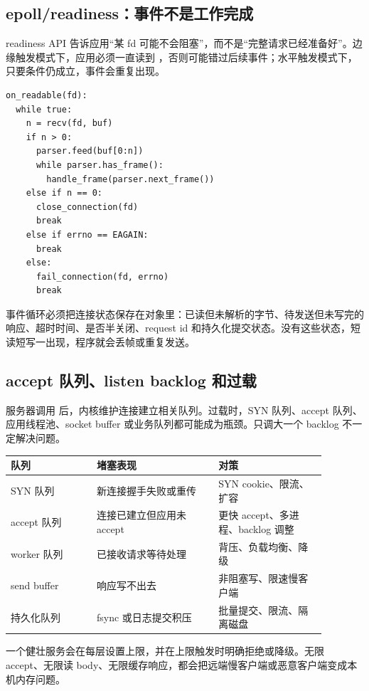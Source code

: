 \subsection{epoll/readiness：事件不是工作完成}

readiness API 告诉应用“某 fd 可能不会阻塞”，而不是“完整请求已经准备好”。边缘触发模式下，应用必须一直读到 ，否则可能错过后续事件；水平触发模式下，只要条件仍成立，事件会重复出现。

\begin{lstlisting}
on_readable(fd):
  while true:
    n = recv(fd, buf)
    if n > 0:
      parser.feed(buf[0:n])
      while parser.has_frame():
        handle_frame(parser.next_frame())
    else if n == 0:
      close_connection(fd)
      break
    else if errno == EAGAIN:
      break
    else:
      fail_connection(fd, errno)
      break
\end{lstlisting}

事件循环必须把连接状态保存在对象里：已读但未解析的字节、待发送但未写完的响应、超时时间、是否半关闭、request id 和持久化提交状态。没有这些状态，短读短写一出现，程序就会丢帧或重复发送。

\subsection{accept 队列、listen backlog 和过载}

服务器调用  后，内核维护连接建立相关队列。过载时，SYN 队列、accept 队列、应用线程池、socket buffer 或业务队列都可能成为瓶颈。只调大一个 backlog 不一定解决问题。

\begin{longtable}{|p{0.24\linewidth}|p{0.34\linewidth}|p{0.3\linewidth}|}
\toprule
队列 & 堵塞表现 & 对策 \\
\midrule
SYN 队列 & 新连接握手失败或重传 & SYN cookie、限流、扩容 \\\tablerowrule
accept 队列 & 连接已建立但应用未 accept & 更快 accept、多进程、backlog 调整 \\\tablerowrule
worker 队列 & 已接收请求等待处理 & 背压、负载均衡、降级 \\\tablerowrule
send buffer & 响应写不出去 & 非阻塞写、限速慢客户端 \\\tablerowrule
持久化队列 & fsync 或日志提交积压 & 批量提交、限流、隔离磁盘 \\
\bottomrule
\end{longtable}

一个健壮服务会在每层设置上限，并在上限触发时明确拒绝或降级。无限 accept、无限读 body、无限缓存响应，都会把远端慢客户端或恶意客户端变成本机内存问题。

